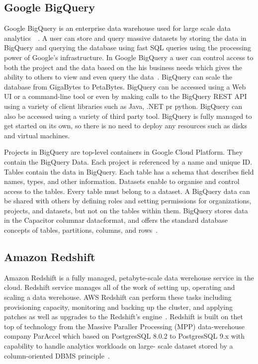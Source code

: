 \subsection{Google BigQuery}


Google BigQuery is an enterprise data warehouse used for large scale
data analytics~\cite{www-bigquery-documentation}~\cite{www-bigquery}.
A user can store and query massive datasets by storing the data in
BigQuery and querying the database using fast SQL queries using the
processing power of Google's infrastructure. In Google BigQuery a user
can control access to both the project and the data based on the his
business needs which gives the ability to others to view and even
query the data~\cite{www-bigquery}. BigQuery can scale the database
from GigaBytes to PetaBytes. BigQuery can be accessed using a Web UI
or a command-line tool or even by making calls to the BigQuery REST
API using a variety of client libraries such as Java, .NET pr
python. BigQuery can also be accessed using a variety of third party
tool. BigQuery is fully managed to get started on its own, so there is
no need to deploy any resources such as disks and virtual machines.

Projects in BigQuery are top-level containers in Google Cloud
Platform\cite{www-bigquery-documentation}. They contain the BigQuery
Data. Each project is referenced by a name and unique ID. Tables
contain the data in BigQuery. Each table has a schema that describes
field names, types, and other information. Datasets enable to organise
and control access to the tables. Every table must belong to a
dataset. A BigQuery data can be shared with others by defining roles
and setting permissions for organizations, projects, and datasets, but
not on the tables within them. BigQuery stores data in the Capacitor
columnar datacformat, and offers the standard database concepts of
tables, partitions, columns, and
rows~\cite{www-bigquery-columnar-storage}.

     \pv

     
\subsection{Amazon Redshift}
     
Amazon Redshift is a fully managed, petabyte-scale data werehouse
service in the cloud. Redshift service manages all of the work of
setting up, operating and scaling a data werehouse. AWS Redshift can
perform these tasks including provisioning capacity, monitoring and
backing up the cluster, and applying patches as well as upgrades to
the Redshift's engine~\cite{www-redshift}.  Redshift is built on thet
top of technology from the Massive Paraller Processing (MPP)
data-werehouse company ParAccel which based on PostgresSQL 8.0.2 to
PostgresSQL 9.x with capability to handle analytics workloads on
large- scale dataset stored by a column-oriented DBMS
principle~\cite{www-wiki-red}.

